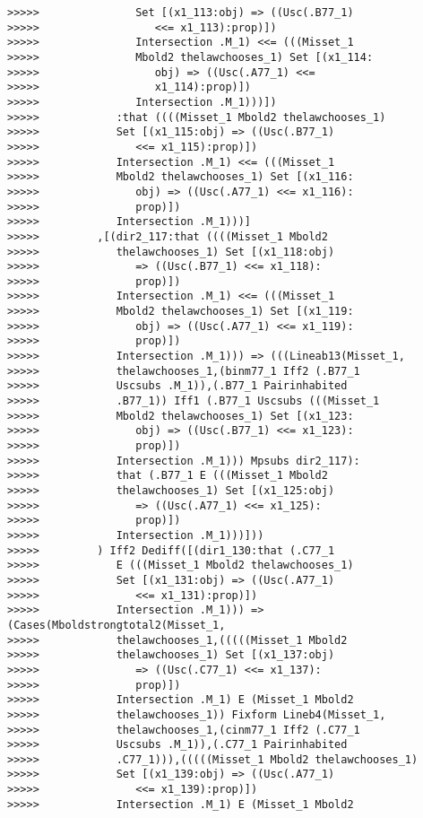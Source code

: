 \documentclass[12pt]{article}
\begin{document}
\begin{verbatim}
>>>>>               Set [(x1_113:obj) => ((Usc(.B77_1)
>>>>>                  <<= x1_113):prop)])
>>>>>               Intersection .M_1) <<= (((Misset_1
>>>>>               Mbold2 thelawchooses_1) Set [(x1_114:
>>>>>                  obj) => ((Usc(.A77_1) <<=
>>>>>                  x1_114):prop)])
>>>>>               Intersection .M_1)))])
>>>>>            :that ((((Misset_1 Mbold2 thelawchooses_1)
>>>>>            Set [(x1_115:obj) => ((Usc(.B77_1)
>>>>>               <<= x1_115):prop)])
>>>>>            Intersection .M_1) <<= (((Misset_1
>>>>>            Mbold2 thelawchooses_1) Set [(x1_116:
>>>>>               obj) => ((Usc(.A77_1) <<= x1_116):
>>>>>               prop)])
>>>>>            Intersection .M_1)))]
>>>>>         ,[(dir2_117:that ((((Misset_1 Mbold2
>>>>>            thelawchooses_1) Set [(x1_118:obj)
>>>>>               => ((Usc(.B77_1) <<= x1_118):
>>>>>               prop)])
>>>>>            Intersection .M_1) <<= (((Misset_1
>>>>>            Mbold2 thelawchooses_1) Set [(x1_119:
>>>>>               obj) => ((Usc(.A77_1) <<= x1_119):
>>>>>               prop)])
>>>>>            Intersection .M_1))) => (((Lineab13(Misset_1,
>>>>>            thelawchooses_1,(binm77_1 Iff2 (.B77_1
>>>>>            Uscsubs .M_1)),(.B77_1 Pairinhabited
>>>>>            .B77_1)) Iff1 (.B77_1 Uscsubs (((Misset_1
>>>>>            Mbold2 thelawchooses_1) Set [(x1_123:
>>>>>               obj) => ((Usc(.B77_1) <<= x1_123):
>>>>>               prop)])
>>>>>            Intersection .M_1))) Mpsubs dir2_117):
>>>>>            that (.B77_1 E (((Misset_1 Mbold2
>>>>>            thelawchooses_1) Set [(x1_125:obj)
>>>>>               => ((Usc(.A77_1) <<= x1_125):
>>>>>               prop)])
>>>>>            Intersection .M_1)))]))
>>>>>         ) Iff2 Dediff([(dir1_130:that (.C77_1
>>>>>            E (((Misset_1 Mbold2 thelawchooses_1)
>>>>>            Set [(x1_131:obj) => ((Usc(.A77_1)
>>>>>               <<= x1_131):prop)])
>>>>>            Intersection .M_1))) => (Cases(Mboldstrongtotal2(Misset_1,
>>>>>            thelawchooses_1,(((((Misset_1 Mbold2
>>>>>            thelawchooses_1) Set [(x1_137:obj)
>>>>>               => ((Usc(.C77_1) <<= x1_137):
>>>>>               prop)])
>>>>>            Intersection .M_1) E (Misset_1 Mbold2
>>>>>            thelawchooses_1)) Fixform Lineb4(Misset_1,
>>>>>            thelawchooses_1,(cinm77_1 Iff2 (.C77_1
>>>>>            Uscsubs .M_1)),(.C77_1 Pairinhabited
>>>>>            .C77_1))),(((((Misset_1 Mbold2 thelawchooses_1)
>>>>>            Set [(x1_139:obj) => ((Usc(.A77_1)
>>>>>               <<= x1_139):prop)])
>>>>>            Intersection .M_1) E (Misset_1 Mbold2

\end{verbatim}
\end{document}
